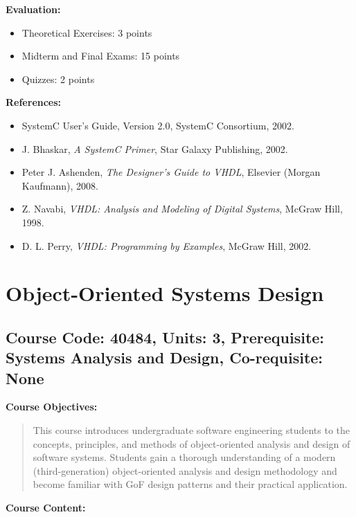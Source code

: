 \documentclass[12pt]{article}
\begin{document}
\textbf{Evaluation:}
\begin{itemize}
    \item Theoretical Exercises: 3 points
    \item Midterm and Final Exams: 15 points
    \item Quizzes: 2 points
\end{itemize}

\textbf{References:}
\begin{itemize}
    \item SystemC User’s Guide, Version 2.0, SystemC Consortium, 2002.
    \item J. Bhaskar, \textit{A SystemC Primer}, Star Galaxy Publishing, 2002.
    \item Peter J. Ashenden, \textit{The Designer's Guide to VHDL}, Elsevier (Morgan Kaufmann), 2008.
    \item Z. Navabi, \textit{VHDL: Analysis and Modeling of Digital Systems}, McGraw Hill, 1998.
    \item D. L. Perry, \textit{VHDL: Programming by Examples}, McGraw Hill, 2002.
\end{itemize}

\newpage

\section{Object-Oriented Systems Design}
\subsection*{Course Code: 40484, Units: 3, Prerequisite: Systems Analysis and Design, Co-requisite: None}

\textbf{Course Objectives:} 
\begin{quote}
   This course introduces undergraduate software engineering students to the concepts, principles, and methods of object-oriented analysis and design of software systems. Students gain a thorough understanding of a modern (third-generation) object-oriented analysis and design methodology and become familiar with GoF design patterns and their practical application.
\end{quote}

\textbf{Course Content:}
\end{document}
